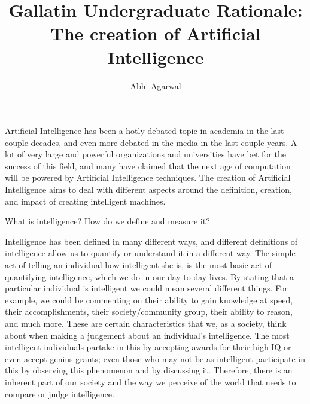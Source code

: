 \documentclass[11pt]{article}
\title{Gallatin Undergraduate Rationale: The creation of Artificial Intelligence}
\author{Abhi Agarwal}
\date{}
\begin{document}
\maketitle


\par Artificial Intelligence has been a hotly debated topic in academia in the last couple decades, and even more debated in the media in the last couple years. A lot of very large and powerful organizations and universities have bet for the success of this field, and many have claimed that the next age of computation will be powered by Artificial Intelligence techniques. The creation of Artificial Intelligence aims to deal with different aspects around the definition, creation, and impact of creating intelligent machines.\\
\begin{center}
	{\large What is intelligence? How do we define and measure it?\par}
\end{center}

\par Intelligence has been defined in many different ways, and different definitions of intelligence allow us to quantify or understand it in a different way. The simple act of telling an individual how intelligent she is, is the most basic act of quantifying intelligence, which we do in our day-to-day lives. By stating that a particular individual is intelligent we could mean several different things. For example, we could be commenting on their ability to gain knowledge at speed, their accomplishments, their society/community group, their ability to reason, and much more. These are certain characteristics that we, as a society, think about when making a judgement about an individual's intelligence. The most intelligent individuals partake in this by accepting awards for their high IQ or even accept genius grants; even those who may not be as intelligent participate in this by observing this phenomenon and by discussing it. Therefore, there is an inherent part of our society and the way we perceive of the world that needs to compare or judge intelligence.
\end{document}
